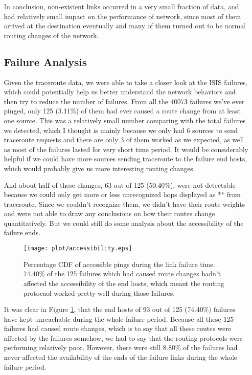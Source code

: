 \documentclass[conference, twocolumn, oneside, 10pt]{IEEEtran}
\begin{document}
In conclusion, non-existent links occurred in a very small fraction of data, and had relatively small impact on the performance of network, since most of them arrived at the destination eventually and many of them turned out to be normal routing changes of the network.

\subsection{Failure Analysis}

Given the traceroute data, we were able to take a closer look at the ISIS failures, which could potentially help us better understand the network behaviors and then try to reduce the number of failures. From all the 40073 failures we've ever pinged, only 125 (3.11\%) of them had ever caused a route change from at least one source. This was a relatively small number comparing with the total failures we detected, which I thought is mainly because we only had 6 sources to send traceroute requests and there are only 3 of them worked as we expected, as well as most of the failures lasted for very short time period. It would be considerably helpful if we could have more sources sending traceroute to the failure end hosts, which would probably give us more interesting routing changes.

And about half of these changes, 63 out of 125 (50.40\%), were not detectable because we could only get more or less unrecognized hops displayed as ** from traceroute. Since we couldn't recognize them, we didn't have their route weights and were not able to draw any conclusions on how their routes change quantitatively. But we could still do some analysis about the accessibility of the failure ends.

\begin{figure}[h!]
\centering
\texttt{[image: plot/accessibility.eps]}
\caption{Percentage CDF of accessible pings during the link failure time. 74.40\% of the 125 failures which had caused route changes hadn't affected the accessibility of the end hosts, which meant the routing protocaol worked pretty well during those failures.}
\label{fig:accessibility}
\end{figure}

It was clear in Figure \ref{fig:accessibility}, that the end hosts of 93 out of 125 (74.40\%) failures have kept unreachable during the whole failure period. Because all these 125 failures had caused route changes, which is to say that all these routes were affected by the failures somehow, we had to say that the routing protocols were performing relatively poor. However, there were still 8.80\% of the failures had never affected the availability of the ends of the failure links during the whole failure period.
\end{document}
